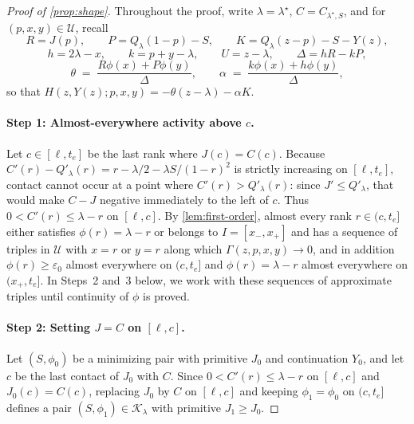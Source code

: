 \documentclass[11pt]{article}
\numberwithin{equation}{section}
\theoremstyle{plain}
\theoremstyle{definition}
\newcommand{\1}{\mathbf{1}}
\newcommand{\calK}{\mathcal{K}}
\newcommand{\calU}{\mathcal{U}}
\begin{document}
\begin{proof}[Proof of {\cref{prop:shape}}]
Throughout the proof, write $\lambda = \lambda^\star$, $C = C_{\lambda^\star, S}$, and for $(p, x, y) \in \calU$, recall
\[
  R = J(p), \qquad P = Q_\lambda(1 - p) - S, \qquad K = Q_\lambda(z - p) - S - Y(z),
\]
\[
  h = 2\lambda - x, \qquad k = p + y - \lambda, \qquad U = z - \lambda, \qquad \Delta = h R - k P,
\]
\[
  \theta \;=\; \frac{R\phi(x) + P\phi(y)}{\Delta}, \qquad \alpha \;=\; \frac{k\phi(x) + h\phi(y)}{\Delta},
\]
so that $H(z, Y(z); p, x, y) = -\theta(z - \lambda) - \alpha K$.

\paragraph{Step 1: Almost-everywhere activity above $c$.}
Let $c \in [\ell, t_e]$ be the last rank where $J(c) = C(c)$. Because $C'(r) - Q'_\lambda(r) = r - \lambda/2 - \lambda S/(1 - r)^2$ is strictly increasing on $[\ell, t_e]$, contact cannot occur at a point where $C'(r) > Q'_\lambda(r)$: since $J' \le Q'_\lambda$, that would make $C - J$ negative immediately to the left of $c$. Thus $0 < C'(r) \le \lambda - r$ on $[\ell, c]$. By \cref{lem:first-order}, almost every rank $r \in (c, t_e]$ either satisfies $\phi(r) = \lambda - r$ or belongs to $I = [x_-, x_+]$ and has a sequence of triples in $\calU$ with $x = r$ or $y = r$ along which $\Gamma(z, p, x, y) \to 0$, and in addition $\phi(r) \ge \varepsilon_0$ almost everywhere on $(c, t_e]$ and $\phi(r) = \lambda - r$ almost everywhere on $(x_+, t_e]$. In Steps~2 and~3 below, we work with these sequences of approximate triples until continuity of $\phi$ is proved.

\paragraph{Step 2: Setting $J = C$ on $[\ell, c]$.}
Let $(S, \phi_0)$ be a minimizing pair with primitive $J_0$ and continuation $Y_0$, and let $c$ be the last contact of $J_0$ with $C$. Since $0 < C'(r) \le \lambda - r$ on $[\ell, c]$ and $J_0(c) = C(c)$, replacing $J_0$ by $C$ on $[\ell, c]$ and keeping $\phi_1 = \phi_0$ on $(c, t_e]$ defines a pair $(S, \phi_1) \in \calK_\lambda$ with primitive $J_1 \ge J_0$.


\end{proof}
\end{document}
